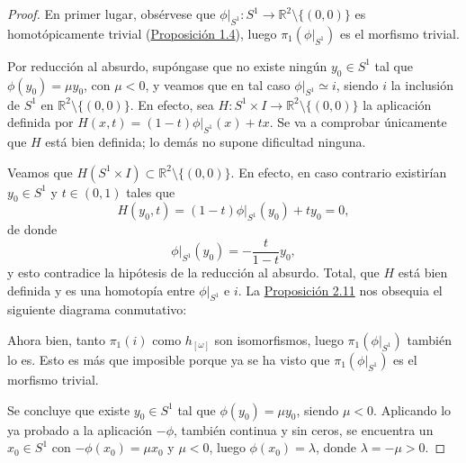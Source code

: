 \documentclass[11pt]{report}
\theoremstyle{definition}
\theoremstyle{definition}
\theoremstyle{remark}
\newcommand{\R}{\mathbb R}
\begin{document}
\begin{proof}
En primer lugar, obsérvese que $\phi |_{S^1} \colon S^1 \to \R^2 \setminus \{(0,0)\}$ es homotópicamente trivial (\hyperref[prop1.4.]{\color{blue}Proposición 1.4}), luego $\pi_1(\phi |_{S^1})$ es el morfismo trivial.

\vspace{2mm}

Por reducción al absurdo, supóngase que no existe ningún $y_0 \in S^1$ tal que $\phi (y_0) = \mu y_0$, con $\mu < 0$, y veamos que en tal caso $\phi |_{S^1} \simeq i$, siendo $i$ la inclusión de $S^1$ en $\R^2 \setminus \{(0,0)\}$. En efecto, sea $H \colon S^1 \times I \to \R^2 \setminus \{(0,0)\}$ la aplicación definida por $H(x,t) = (1-t)\phi |_{S^1}(x)+tx$. Se va a comprobar únicamente que $H$ está bien definida; lo demás no supone dificultad ninguna.

\vspace{2mm}

Veamos que $H(S^1 \times I) \subset \R^2 \setminus \{(0,0)\}$. En efecto, en caso contrario existirían $y_0 \in S^1$ y $t \in (0,1)$ tales que
\[H(y_0,t) = (1-t)\phi |_{S^1}(y_0) +ty_0 = 0,\]
de donde
\[\phi |_{S^1} (y_0) = -\frac{t}{1-t}y_0,\]
y esto contradice la hipótesis de la reducción al absurdo. Total, que $H$ está bien definida y es una homotopía entre $\phi |_{S^1}$ e $i$. La \hyperref[prop2.11.]{\color{blue}Proposición 2.11} nos obsequia el siguiente diagrama conmutativo:
\begin{center}
\end{center}
Ahora bien, tanto $\pi_1(i)$ como $h_{[\omega]}$ son isomorfismos, luego $\pi_1(\phi |_{S^1})$ también lo es. Esto es más que imposible porque ya se ha visto que $\pi_1(\phi |_{S^1})$  es el morfismo trivial.

\vspace{2mm}

Se concluye que existe $y_0 \in S^1$ tal que $\phi(y_0) = \mu y_0$, siendo $\mu < 0$. Aplicando lo ya probado a la aplicación $-\phi$, también continua y sin ceros, se encuentra un $x_0 \in S^1$ con $-\phi(x_0) = \mu x_0$ y $\mu <0$, luego $\phi(x_0) = \lambda$, donde $\lambda=-\mu >0$.
\end{proof}
\end{document}
